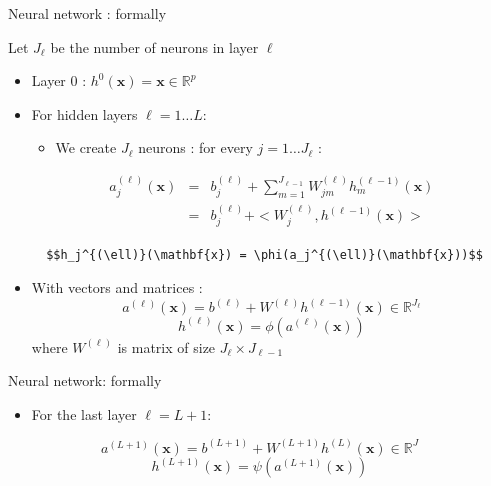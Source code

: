 \documentclass[ignorenonframetext,]{beamer}
\providecommand{\tightlist}{%
  \setlength{\itemsep}{0pt}\setlength{\parskip}{0pt}}
\begin{document}
\begin{frame}[fragile]{Neural network : formally}
\protect\hypertarget{neural-network-formally}{}

Let \(J_{\ell}\) be the number of neurons in layer \(\ell\)

\begin{itemize}
\item
  Layer \(0\) : \(h^0(\mathbf{x}) = \mathbf{x} \in \mathbb{R}^p\)
\item
  For hidden layers \(\ell = 1\dots L\):

  \begin{itemize}
  \tightlist
  \item
    We create \(J_{\ell}\) neurons : for every \(j = 1 \dots J_{\ell}\)
    :
  \end{itemize}

  \begin{eqnarray*}
        a^{(\ell)}_j(\mathbf{x}) &=& b^{(\ell)}_j + \sum_{m=1}^{J_{\ell-1}} W^{(\ell)}_{jm} h_m^{(\ell-1)}(\mathbf{x}) \\
        &=& b^{(\ell)}_j + < W^{(\ell)}_{j},  h ^{(\ell-1)}(\mathbf{x}) >
        \end{eqnarray*}

\begin{verbatim}
  $$h_j^{(\ell)}(\mathbf{x}) = \phi(a_j^{(\ell)}(\mathbf{x}))$$
\end{verbatim}
\item
  With vectors and matrices :
  \[a^{(\ell)}(\mathbf{x}) = b^{(\ell)} +W^{(\ell)} h^{(\ell-1)}(\mathbf{x}) \in \mathbb{R}^{J_{\ell}}\]
  \[h^{(\ell)}(\mathbf{x}) = \phi(a^{(\ell)}(\mathbf{x}))\] where
  \(W^{(\ell)}\) is matrix of size \(J_{\ell} \times J_{\ell-1}\)
\end{itemize}

\end{frame}

\begin{frame}{Neural network: formally}
\protect\hypertarget{neural-network-formally-1}{}

\begin{itemize}
\tightlist
\item
  For the last layer \(\ell = L+1\):
\end{itemize}

\[a^{(L+1)}(\mathbf{x}) = b^{(L+1)} +W^{(L+1)} h^{(L)}(\mathbf{x}) \in \mathbb{R}^J\]
\[h^{(L+1)}(\mathbf{x}) = \psi(a^{(L+1)}(\mathbf{x}))\]

\end{frame}
\end{document}
